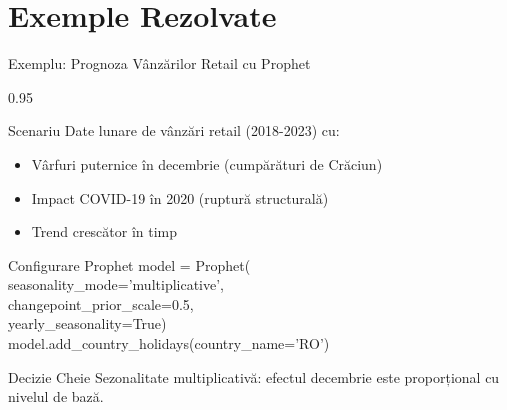 \documentclass[9pt, aspectratio=169, t]{beamer}
\begin{document}
\section{Exemple Rezolvate}

\begin{frame}{Exemplu: Prognoza Vânzărilor Retail cu Prophet}
    \begin{cminipage}{0.95\textwidth}
    {\small
    \begin{block}{Scenariu}
        Date lunare de vânzări retail (2018-2023) cu:
        \begin{itemize}\setlength{\itemsep}{0pt}
            \item Vârfuri puternice în decembrie (cumpărături de Crăciun)
            \item Impact COVID-19 în 2020 (ruptură structurală)
            \item Trend crescător în timp
        \end{itemize}
    \end{block}
    \begin{exampleblock}{Configurare Prophet}
        {\scriptsize\ttfamily
        model = Prophet(\\
        \quad seasonality\_mode='multiplicative',\\
        \quad changepoint\_prior\_scale=0.5,\\
        \quad yearly\_seasonality=True)\\
        model.add\_country\_holidays(country\_name='RO')
        }
    \end{exampleblock}
    \begin{alertblock}{Decizie Cheie}
        Sezonalitate multiplicativă: efectul decembrie este proporțional cu nivelul de bază.
    \end{alertblock}
    }
    \end{cminipage}
\end{frame}
\end{document}
